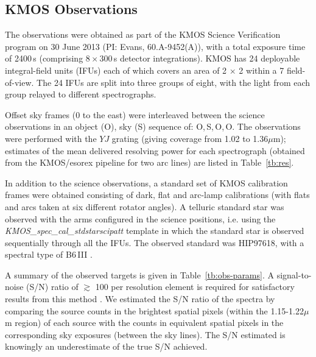 \documentclass[iop]{emulateapj}
\begin{document}

\subsection{KMOS Observations} %
\label{sub:observations}

The observations were obtained as part of the KMOS Science Verification program on 30 June 2013 (PI: Evans, 60.A-9452(A)),
with a total exposure time of 2400\,s
(comprising 8\,$\times$\,300\,s detector integrations).
KMOS has 24 deployable integral-field units (IFUs) each of which covers an area of
2 $\times$ 2 within a 7 field-of-view.
The 24 IFUs are split into three groups of eight, with the light from each group relayed to different spectrographs.

Offset sky frames
(0 to the east) were interleaved between the science observations in an object (O), sky (S) sequence of:
O,\,S,\,O,\,O.
The observations were performed with the $YJ$ grating
(giving coverage from 1.02 to 1.36$\mu$m);
estimates of the mean delivered resolving power for each spectrograph (obtained from the KMOS/esorex pipeline for two arc lines) are listed in Table~\ref{tb:res}.

In addition to the science observations, a standard set of KMOS calibration frames were obtained consisting of dark, flat and arc-lamp calibrations (with flats and arcs taken at six different rotator angles).
A telluric standard star was observed with the arms configured in the science positions, i.e. using the {\em KMOS\_spec\_cal\_stdstarscipatt} template in which the standard star is observed sequentially through all the IFUs.
The observed standard was HIP97618, with a spectral type of B6\,III
\citep{1988mcts.book.....H}.

A summary of the observed targets is given in
Table~\ref{tb:obs-params}.
A signal-to-noise (S/N) ratio of $\gtrsim$ 100 per resolution element is required for satisfactory results from this method
\citep[see][]{2014ApJ...788...58G}.
We estimated the S/N ratio of the spectra by comparing the source counts in the brightest spatial pixels
(within the 1.15-1.22$\mu$m region) of each source with the counts in equivalent spatial pixels in the corresponding sky exposures
(between the sky lines).
The S/N estimated is knowingly an underestimate of the true S/N achieved.

\end{document}
